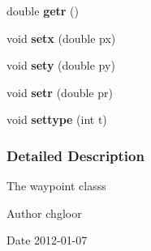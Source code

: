 \begin{DoxyCompactItemize}
\item 
\hypertarget{classPed_1_1Twaypoint_a11d04eb4bb17e1e2fccdc976a934eddb}{
double {\bfseries getr} ()}
\label{classPed_1_1Twaypoint_a11d04eb4bb17e1e2fccdc976a934eddb}

\item 
\hypertarget{classPed_1_1Twaypoint_aa816c6a0a45ba60d5fe842f2b8e80f1f}{
void {\bfseries setx} (double px)}
\label{classPed_1_1Twaypoint_aa816c6a0a45ba60d5fe842f2b8e80f1f}

\item 
\hypertarget{classPed_1_1Twaypoint_a3cea2acb15c019547246a6e2e0025b0a}{
void {\bfseries sety} (double py)}
\label{classPed_1_1Twaypoint_a3cea2acb15c019547246a6e2e0025b0a}

\item 
\hypertarget{classPed_1_1Twaypoint_aa48c3fb787bb61a70e9b6e9b1a2e15a3}{
void {\bfseries setr} (double pr)}
\label{classPed_1_1Twaypoint_aa48c3fb787bb61a70e9b6e9b1a2e15a3}

\item 
\hypertarget{classPed_1_1Twaypoint_a30779c5565b83f2b3175fa98db6d66e9}{
void {\bfseries settype} (int t)}
\label{classPed_1_1Twaypoint_a30779c5565b83f2b3175fa98db6d66e9}

\end{DoxyCompactItemize}


\subsubsection{Detailed Description}
The waypoint classs \begin{DoxyAuthor}{Author}
chgloor 
\end{DoxyAuthor}
\begin{DoxyDate}{Date}
2012-\/01-\/07 
\end{DoxyDate}


